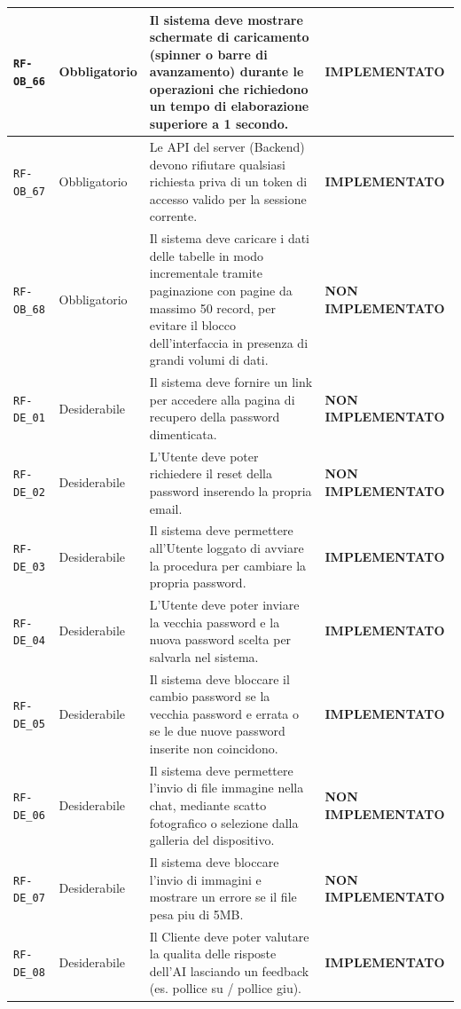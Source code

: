 \documentclass[a4paper, 11pt, oneside]{scrartcl}
\begin{document}
\begin{longtable}{|>{\raggedright\arraybackslash}p{}|>{\raggedright\arraybackslash}p{}|>{\raggedright\arraybackslash}p{}|>{\raggedright\arraybackslash}p{}|}
    \hline
    \texttt{RF-OB\_66} & Obbligatorio & Il sistema deve mostrare schermate di caricamento (spinner o barre di avanzamento) durante le operazioni che richiedono un tempo di elaborazione superiore a 1 secondo. & \textbf{IMPLEMENTATO} \\
    \hline
    \texttt{RF-OB\_67} & Obbligatorio & Le API del server (Backend) devono rifiutare qualsiasi richiesta priva di un token di accesso valido per la sessione corrente. & \textbf{IMPLEMENTATO} \\
    \hline
    \texttt{RF-OB\_68} & Obbligatorio & Il sistema deve caricare i dati delle tabelle in modo incrementale tramite paginazione con pagine da massimo 50 record, per evitare il blocco dell'interfaccia in presenza di grandi volumi di dati. & \textbf{NON IMPLEMENTATO} \\
    \hline
    \texttt{RF-DE\_01} & Desiderabile & Il sistema deve fornire un link per accedere alla pagina di recupero della password dimenticata. & \textbf{NON IMPLEMENTATO} \\
    \hline
    \texttt{RF-DE\_02} & Desiderabile & L'Utente deve poter richiedere il reset della password inserendo la propria email. & \textbf{NON IMPLEMENTATO} \\
    \hline
    \texttt{RF-DE\_03} & Desiderabile & Il sistema deve permettere all'Utente loggato di avviare la procedura per cambiare la propria password. & \textbf{IMPLEMENTATO} \\
    \hline
    \texttt{RF-DE\_04} & Desiderabile & L'Utente deve poter inviare la vecchia password e la nuova password scelta per salvarla nel sistema. & \textbf{IMPLEMENTATO} \\
    \hline
    \texttt{RF-DE\_05} & Desiderabile & Il sistema deve bloccare il cambio password se la vecchia password e errata o se le due nuove password inserite non coincidono. & \textbf{IMPLEMENTATO} \\
    \hline
    \texttt{RF-DE\_06} & Desiderabile & Il sistema deve permettere l'invio di file immagine nella chat, mediante scatto fotografico o selezione dalla galleria del dispositivo. & \textbf{NON IMPLEMENTATO} \\
    \hline
    \texttt{RF-DE\_07} & Desiderabile & Il sistema deve bloccare l'invio di immagini e mostrare un errore se il file pesa piu di 5MB. & \textbf{NON IMPLEMENTATO} \\
    \hline
    \texttt{RF-DE\_08} & Desiderabile & Il Cliente deve poter valutare la qualita delle risposte dell'AI lasciando un feedback (es. pollice su / pollice giu). & \textbf{IMPLEMENTATO} \\

\end{longtable}
\end{document}
